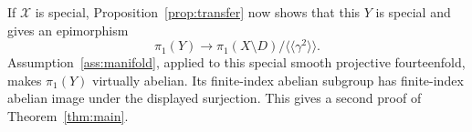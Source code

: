 If $\mathcal X$ is special, Proposition~\ref{prop:transfer} now shows
that this $Y$ is special and gives an epimorphism
\[
 \pi_1(Y)\longrightarrow
 \pi_1(X\setminus D)/\langle\!\langle\gamma^2\rangle\!\rangle.
\]
Assumption~\ref{ass:manifold}, applied to this special smooth projective
fourteenfold, makes $\pi_1(Y)$ virtually abelian. Its finite-index
abelian subgroup has finite-index abelian image under the displayed
surjection. This gives a second proof of Theorem~\ref{thm:main}.
